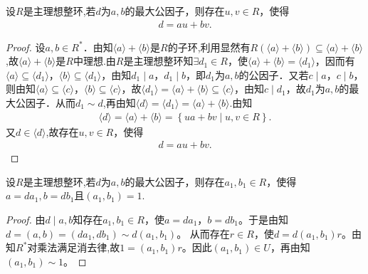 \documentclass[../../main.tex]{subfiles}%
\begin{document}
\begin{corollary}\label{corollary:抽象代数--推论2.5.1}
设$R$是主理想整环,若$d$为$a, b$的最大公因子，则存在$u, v \in R$，使得
\begin{align*}
d = au + bv. 
\end{align*}
\end{corollary}
\begin{proof}

设$a, b \in R^*$．由知$\langle a \rangle + \langle b \rangle$是$R$的子环,利用显然有$R(\langle a \rangle + \langle b \rangle)\subseteq \langle a \rangle + \langle b \rangle$,故$\langle a \rangle + \langle b \rangle$是$R$中理想.由$R$是主理想整环知$\exists d_1 \in R$，使$\langle a \rangle + \langle b \rangle = \langle d_1 \rangle$，因而有$\langle a \rangle \subseteq \langle d_1 \rangle$，$\langle b \rangle \subseteq \langle d_1 \rangle$，由知$d_1 \mid a$，$d_1 \mid b$，即$d_1$为$a, b$的公因子．又若$c \mid a$，$c \mid b$，则由知$\langle a \rangle \subseteq \langle c \rangle$，$\langle b \rangle \subseteq \langle c \rangle$，故$\langle d_1 \rangle = \langle a \rangle + \langle b \rangle \subseteq \langle c \rangle$，由知$c \mid d_1$，故$d_1$为$a, b$的最大公因子．从而$d_1\sim d$,再由知$\langle d \rangle=\langle d_1 \rangle = \langle a \rangle + \langle b \rangle$.由知
\begin{align*}
\langle d\rangle =\langle a\rangle +\langle b\rangle =\left\{ ua+bv\mid u,v\in R \right\} .
\end{align*}
又$d\in \langle d\rangle$,故存在$u, v \in R$，使得
\begin{align*}
d = au + bv. 
\end{align*}

\end{proof}

\begin{corollary}\label{corollary:最大公因子的性质-1}
设$R$是主理想整环,若$d$为$a, b$的最大公因子，则存在$a_1, b_1 \in R$，使得$a=da_1,b=db_1$且$(a_1,b_1)=1.$
\end{corollary}
\begin{proof}

由$d\mid a,b$知存在$a_1,b_1\in R$，使$a=da_1$，$b=db_1$。于是由知
$d=(a,b)=(da_1,db_1)\sim d(a_1,b_1)$。
从而存在$r\in R$，使$d=d(a_1,b_1)r$。由知$R^*$对乘法满足消去律,故$1=(a_1,b_1)r$。因此$(a_1,b_1)\in U$，再由知$(a_1,b_1)\sim 1$。

\end{proof}
\end{document}
